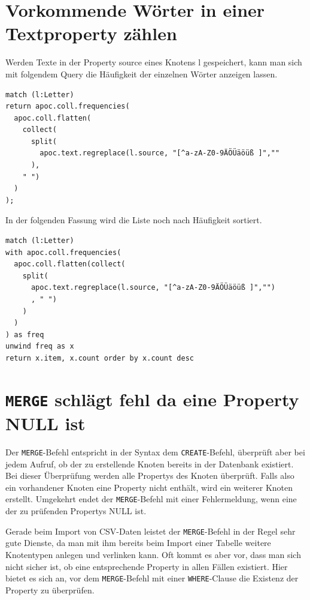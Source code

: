 \documentclass[ngerman,]{scrreprt}
\begin{document}
\section{Vorkommende Wörter in einer Textproperty zählen}\label{vorkommende-wuxf6rter-in-einer-textproperty-zuxe4hlen}

Werden Texte in der Property source eines Knotens l gespeichert, kann man sich mit folgendem Query die Häufigkeit der einzelnen Wörter anzeigen lassen.

\begin{verbatim}
match (l:Letter)
return apoc.coll.frequencies(
  apoc.coll.flatten(
    collect(
      split(
        apoc.text.regreplace(l.source, "[^a-zA-Z0-9ÄÖÜäöüß ]",""
      ),
    " ")
  )
);
\end{verbatim}

In der folgenden Fassung wird die Liste noch nach Häufigkeit sortiert.

\begin{verbatim}
match (l:Letter)
with apoc.coll.frequencies(
  apoc.coll.flatten(collect(
    split(
      apoc.text.regreplace(l.source, "[^a-zA-Z0-9ÄÖÜäöüß ]","")
      , " ")
    )
  )
) as freq
unwind freq as x
return x.item, x.count order by x.count desc
\end{verbatim}

\section{\texorpdfstring{\texttt{MERGE} schlägt fehl da eine Property NULL ist}{MERGE schlägt fehl da eine Property NULL ist}}\label{merge-schluxe4gt-fehl-da-eine-property-null-ist}

Der \texttt{MERGE}-Befehl entspricht in der Syntax dem \texttt{CREATE}-Befehl, überprüft aber bei jedem Aufruf, ob der zu erstellende Knoten bereits in der Datenbank existiert. Bei dieser Überprüfung werden alle Propertys des Knoten überprüft. Falls also ein vorhandener Knoten eine Property nicht enthält, wird ein weiterer Knoten erstellt. Umgekehrt endet der \texttt{MERGE}-Befehl mit einer Fehlermeldung, wenn eine der zu prüfenden Propertys NULL ist.

Gerade beim Import von CSV-Daten leistet der \texttt{MERGE}-Befehl in der Regel sehr gute Dienste, da man mit ihm bereits beim Import einer Tabelle weitere Knotentypen anlegen und verlinken kann. Oft kommt es aber vor, dass man sich nicht sicher ist, ob eine entsprechende Property in allen Fällen existiert. Hier bietet es sich an, vor dem \texttt{MERGE}-Befehl mit einer \texttt{WHERE}-Clause die Existenz der Property zu überprüfen.
\end{document}

